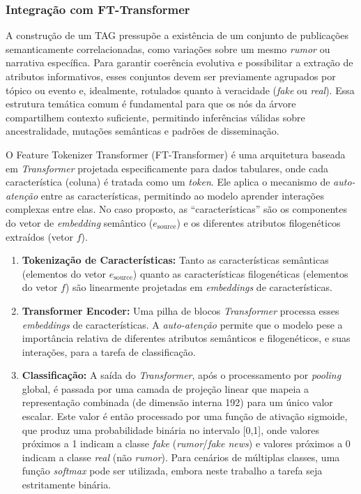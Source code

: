 \documentclass[12pt]{article}
\begin{document}
\subsubsection{Integração com FT-Transformer} \label{subsec:integracao-fttransformer}
A construção de um TAG pressupõe a existência de um conjunto de publicações semanticamente correlacionadas, como variações sobre um mesmo \textit{rumor} ou narrativa específica. Para garantir coerência evolutiva e possibilitar a extração de atributos informativos, esses conjuntos devem ser previamente agrupados por tópico ou evento e, idealmente, rotulados quanto à veracidade (\textit{fake} ou \textit{real}). Essa estrutura temática comum é fundamental para que os nós da árvore compartilhem contexto suficiente, permitindo inferências válidas sobre ancestralidade, mutações semânticas e padrões de disseminação.

O Feature Tokenizer Transformer (FT-Transformer) é uma arquitetura baseada em \textit{Transformer} projetada especificamente para dados tabulares, onde cada característica (coluna) é tratada como um \textit{token}. Ele aplica o mecanismo de \textit{auto-atenção} entre as características, permitindo ao modelo aprender interações complexas entre elas. No caso proposto, as ``características'' são os componentes do vetor de \textit{embedding} semântico ($e_{\text{source}}$) e os diferentes atributos filogenéticos extraídos (vetor $f$).

\begin{enumerate}
    \item \textbf{Tokenização de Características:} Tanto as características semânticas (elementos do vetor $e_{\text{source}}$) quanto as características filogenéticas (elementos do vetor $f$) são linearmente projetadas em \textit{embeddings} de características.
    \item \textbf{Transformer Encoder:} Uma pilha de blocos \textit{Transformer} processa esses \textit{embeddings} de características. A \textit{auto-atenção} permite que o modelo pese a importância relativa de diferentes atributos semânticos e filogenéticos, e suas interações, para a tarefa de classificação.
    \item \textbf{Classificação:} A saída do \textit{Transformer}, após o processamento por \textit{pooling} global, é passada por uma camada de projeção linear que mapeia a representação combinada (de dimensão interna 192) para um único valor escalar. Este valor é então processado por uma função de ativação sigmoide, que produz uma probabilidade binária no intervalo [0,1], onde valores próximos a 1 indicam a classe \textit{fake} (\textit{rumor}/\textit{fake news}) e valores próximos a 0 indicam a classe \textit{real} (não \textit{rumor}). Para cenários de múltiplas classes, uma função \textit{softmax} pode ser utilizada, embora neste trabalho a tarefa seja estritamente binária.
\end{enumerate}
\end{document}
